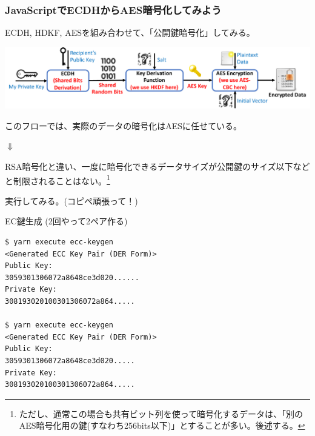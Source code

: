 \documentclass[12pt,dvipdfmx]{beamer}
\begin{document}
\begin{frame}
\frametitle{JavaScriptでECDHからAES暗号化してみよう}
ECDH, HDKF, AESを組み合わせて、「公開鍵暗号化」してみる。

\begin{center}
\includegraphics[width=\linewidth]{Figs/ecdh-flow03.pdf}
\end{center}

このフローでは、\alert{実際のデータの暗号化はAESに任せている}。
\begin{center}
 $\Downarrow$
\end{center}
RSA暗号化と違い、一度に暗号化できるデータサイズが公開鍵のサイズ以下などと制限されることはない。\footnote[frame]{\scriptsize ただし、通常この場合も共有ビット列を使って暗号化するデータは、「別のAES暗号化用の鍵(すなわち256bits以下)」とすることが多い。後述する。}
\end{frame}

\begin{frame}[fragile]
実行してみる。(コピペ頑張って！)

\begin{exampleblock}{\small EC鍵生成 (2回やって2ペア作る)}
\scriptsize
\begin{verbatim}
$ yarn execute ecc-keygen
<Generated ECC Key Pair (DER Form)>
Public Key:
3059301306072a8648ce3d020......
Private Key:
308193020100301306072a864.....

$ yarn execute ecc-keygen
<Generated ECC Key Pair (DER Form)>
Public Key:
3059301306072a8648ce3d020.....
Private Key:
308193020100301306072a864.....
\end{verbatim}
\end{exampleblock}
 
\end{frame}
\end{document}
